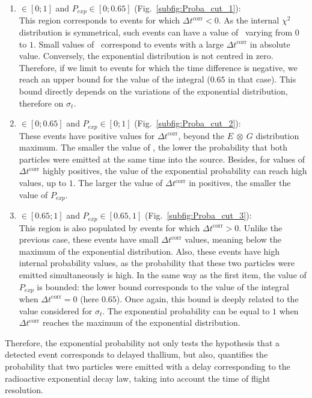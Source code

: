 \begin{enumerate}
\item \Pint$\in[0;1]$ and $P_{exp}\in[0;0.65]$ (Fig.~\ref{subfig:Proba_cut_1}):\\
  This region corresponds to events for which $\Delta t^{\text{corr}}<0$.
  As the internal $\chi^{2}$ distribution is symmetrical, such events can have a value of \Pint\ varying from $0$ to $1$.
  Small values of \Pint\ correspond to events with a large $\Delta t^{\text{corr}}$ in absolute value.
  Conversely, the exponential distribution is not centred in zero.
  Therefore, if we limit to events for which the time difference is negative, we reach an upper bound for the value of the integral ($0.65$ in that case).
  This bound directly depends on the variations of the exponential distribution, therefore on $\sigma_{t}$.
\item \Pint$\in[0;0.65]$ and $P_{exp}\in[0;1]$ (Fig.~\ref{subfig:Proba_cut_2}):\\
  These events have positive values for $\Delta t^{\text{corr}}$, beyond the $E~\otimes~G$ distribution maximum.
  The smaller the value of \Pint, the lower the probability that both particles were emitted at the same time into the source.
  Besides, for values of $\Delta t^{\text{corr}}$ highly positives, the value of the exponential probability can reach high values, up to $1$.
  The larger the value of $\Delta t^{\text{corr}}$ in positives, the smaller the value of $P_{exp}$.
\item \Pint$\in[0.65;1]$ and $P_{exp}\in[0.65,1]$ (Fig.~\ref{subfig:Proba_cut_3}):\\
  This region is also populated by events for which $\Delta t^{\text{corr}}>0$.
  Unlike the previous case, these events have small $\Delta t^{\text{corr}}$ values, meaning below the maximum of the exponential distribution.
  Also, these events have high internal probability values, as the probability that these two particles were emitted simultaneously is high.
  In the same way as the first item, the value of $P_{exp}$ is bounded: the lower bound corresponds to the value of the integral when $\Delta t^{\text{corr}}=0$ (here $0.65$).
  Once again, this bound is deeply related to the value considered for $\sigma_{t}$.
  The exponential probability can be equal to $1$ when $\Delta t^{\text{corr}}$ reaches the maximum of the exponential distribution.
\end{enumerate}
Therefore, the exponential probability not only tests the hypothesis that a detected event corresponds to delayed thallium, but also, quantifies the probability that two particles were emitted with a delay corresponding to the radioactive exponential decay law, taking into account the time of flight resolution.

